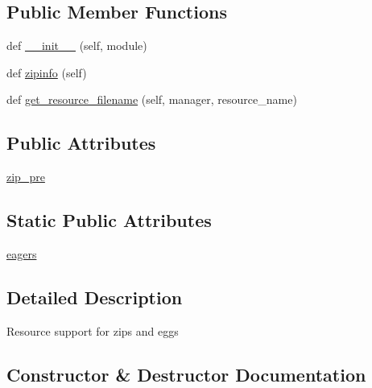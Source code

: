 \subsection*{Public Member Functions}
\begin{DoxyCompactItemize}
\item 
def \hyperlink{classpkg__resources_1_1ZipProvider_a8f5abbc9d5949fcbc54f27aff4c06e41}{\+\_\+\+\_\+init\+\_\+\+\_\+} (self, module)
\item 
def \hyperlink{classpkg__resources_1_1ZipProvider_aa90f68344e70df026ca6d233dae858e1}{zipinfo} (self)
\item 
def \hyperlink{classpkg__resources_1_1ZipProvider_afa80d21e26b8d79d8be636f3bfe5d94b}{get\+\_\+resource\+\_\+filename} (self, manager, resource\+\_\+name)
\end{DoxyCompactItemize}
\subsection*{Public Attributes}
\begin{DoxyCompactItemize}
\item 
\hyperlink{classpkg__resources_1_1ZipProvider_a8c7e07e72f08f590b78a57b55f4b04e8}{zip\+\_\+pre}
\end{DoxyCompactItemize}
\subsection*{Static Public Attributes}
\begin{DoxyCompactItemize}
\item 
\hyperlink{classpkg__resources_1_1ZipProvider_a0887e6dee1cc39873e6c4666423c4b17}{eagers}
\end{DoxyCompactItemize}


\subsection{Detailed Description}
\begin{DoxyVerb}Resource support for zips and eggs\end{DoxyVerb}
 

\subsection{Constructor \& Destructor Documentation}
\mbox{\label{classpkg__resources_1_1ZipProvider_a8f5abbc9d5949fcbc54f27aff4c06e41}} 
